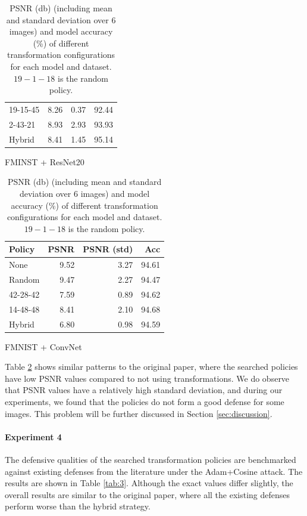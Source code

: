 \begin{table}[h]
\begin{subtable}[h]{0.21\textwidth}
\begin{tabular}{lrrr}
             19-15-45 &        8.26 &       0.37 & 92.44 \\
             2-43-21  &        8.93 &       2.93 & 93.93 \\
             Hybrid   &        8.41 &       1.45 & 95.14 \\
            \hline
        \end{tabular}
        \caption{FMINST + ResNet20}
    \end{subtable}
    \hspace{55mm}%
    \begin{subtable}[h]{0.21\textwidth}
        \centering
        \begin{tabular}{lrrr}
            \hline
             Policy   &   PSNR &   PSNR (std) &   Acc \\
            \hline
             None     &        9.52 &       3.27 & 94.61 \\
             Random   &        9.47 &       2.27 & 94.47 \\
             42-28-42 &        7.59 &       0.89 & 94.62 \\
             14-48-48 &        8.41 &       2.10 & 94.68 \\
             Hybrid   &        6.80 &       0.98 & 94.59 \\
            \hline
        \end{tabular}
        \caption{FMNIST + ConvNet}
    \end{subtable}
    \caption{PSNR (db) (including mean and standard deviation over $6$ images) and model accuracy (\%) of different transformation configurations for each model and dataset. $19-1-18$ is the random policy.}
    \label{tab:1}
\end{table}
Table \ref{tab:1} shows similar patterns to the original paper, where the searched policies have low PSNR values compared to not using transformations. We do observe that PSNR values have a relatively high standard deviation, and during our experiments, we found that the policies do not form a good defense for some images. This problem will be further discussed in Section \ref{sec:discussion}.

\paragraph{Experiment 4} The defensive qualities of the searched transformation policies are benchmarked against existing defenses from the literature \cite{zhu2019} \cite{wei2020} under the Adam+Cosine attack. The results are shown in Table \ref{tab:3}. Although the exact values differ slightly, the overall results are similar to the original paper, where all the existing defenses perform worse than the hybrid strategy.

